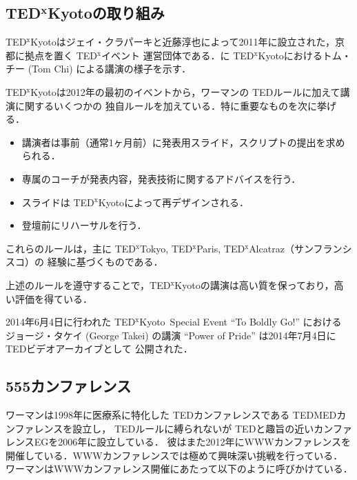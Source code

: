 \documentclass[submit,techreq,jkeyword,noauthor]{ipsj}
\newcommand{\TED}{\textrm{TED}}
\newcommand{\TEDMED}{\textrm{TEDMED}}
\newcommand{\TEDx}{\TED${}^{\textrm{x}}$}
\newcommand{\TEDxTokyo}{\TEDx\textrm{Tokyo}}
\newcommand{\TEDxKyoto}{\TEDx\textrm{Kyoto}}
\newcommand{\TEDxParis}{\TEDx\textrm{Paris}}
\newcommand{\TEDxAlcatraz}{\TEDx\textrm{Alcatraz}}
\newcommand{\TEDtitle}{\textbf{TED}}
\newcommand{\TEDxtitle}{\TEDtitle${}^{\textbf{x}}$}
\newcommand{\TEDxKyototitle}{\TEDxtitle\textbf{Kyoto}}
\begin{document}
\subsection{\TEDxKyototitle の取り組み}

\TEDxKyoto はジェイ・クラパーキと近藤淳也によって2011年に設立された，京都に拠点を置く \TEDx イベント
運営団体である．に \TEDxKyoto におけるトム・チー (Tom Chi) による講演の様子を示す．

\TEDxKyoto は2012年の最初のイベントから，ワーマンの \TED ルールに加えて講演に関するいくつかの
独自ルールを加えている．特に重要なものを次に挙げる．
\begin{itemize}
\item 講演者は事前（通常1ヶ月前）に発表用スライド，スクリプトの提出を求められる．
\item 専属のコーチが発表内容，発表技術に関するアドバイスを行う．
\item スライドは \TEDxKyoto によって再デザインされる．
\item 登壇前にリハーサルを行う．
\end{itemize}
これらのルールは，主に \TEDxTokyo, \TEDxParis, \TEDxAlcatraz  （サンフランシスコ）の
経験に基づくものである．

上述のルールを遵守することで，\TEDxKyoto の講演は高い質を保っており，高い評価を得ている．\cite{ml}

2014年6月4日に行われた \TEDxKyoto\ Special Event ``To Boldly Go!'' における
ジョージ・タケイ (George Takei) の講演 ``Power of Pride'' は2014年7月4日に \TED ビデオアーカイブとして
公開された．

\subsection{555カンファレンス}


ワーマンは1998年に医療系に特化した \TED カンファレンスである \TEDMED カンファレンスを設立し，
\TED ルールに縛られないが \TED と趣旨の近いカンファレンスEGを2006年に設立している．
彼はまた2012年にWWWカンファレンスを開催している．WWWカンファレンスでは極めて興味深い挑戦を行っている．
ワーマンはWWWカンファレンス開催にあたって以下のように呼びかけている．\cite{wwwweb}
\end{document}
